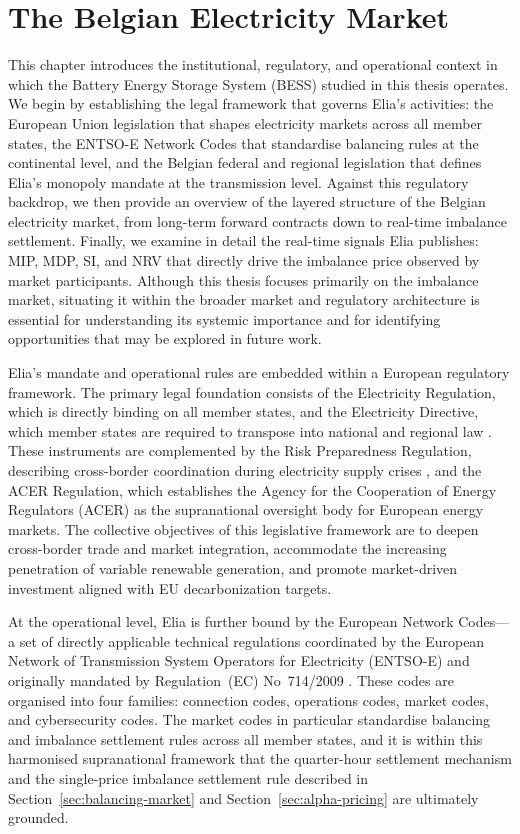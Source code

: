 \chapter{The Belgian Electricity Market}
\label{chap:market}


This chapter introduces the institutional, regulatory, and operational context in which the Battery Energy Storage System (BESS) studied in this thesis operates. We begin by establishing the legal framework that governs Elia's activities: the European Union legislation that shapes electricity markets across all member states, the ENTSO-E Network Codes that standardise balancing rules at the continental level, and the Belgian federal and regional legislation that defines Elia's monopoly mandate at the transmission level. Against this regulatory backdrop, we then provide an overview of the layered structure of the Belgian electricity market, from long-term forward contracts down to real-time imbalance settlement. Finally, we examine in detail the real-time signals Elia publishes: MIP, MDP, SI, and NRV that directly drive the imbalance price observed by market participants. Although this thesis focuses primarily on the imbalance market, situating it within the broader market and regulatory architecture is essential for understanding its systemic importance and for identifying opportunities that may be explored in future work.

Elia's mandate and operational rules are embedded within a European regulatory framework. The primary legal foundation consists of the Electricity Regulation, which is directly binding on all member states, and the Electricity Directive, which member states are required to transpose into national and regional law \cite{Regulation2019943, Directive2019944}. These instruments are complemented by the Risk Preparedness Regulation, describing cross-border coordination during electricity supply crises \cite{Regulation2019941}, and the ACER Regulation, which establishes the Agency for the Cooperation of Energy Regulators (ACER) as the supranational oversight body for European energy markets. The collective objectives of this legislative framework are to deepen cross-border trade and market integration, accommodate the increasing penetration of variable renewable generation, and promote market-driven investment aligned with EU decarbonization targets.

At the operational level, Elia is further bound by the European Network Codes—a set of directly applicable technical regulations coordinated by the European Network of Transmission System Operators for Electricity (ENTSO-E) and originally mandated by Regulation~(EC) No~714/2009 \cite{Regulation2009714}. These codes are organised into four families: connection codes, operations codes, market codes, and cybersecurity codes. The market codes in particular standardise balancing and imbalance settlement rules across all member states, and it is within this harmonised supranational framework that the quarter-hour settlement mechanism and the single-price imbalance settlement rule described in Section~\ref{sec:balancing-market} and Section~\ref{sec:alpha-pricing} are ultimately grounded.

